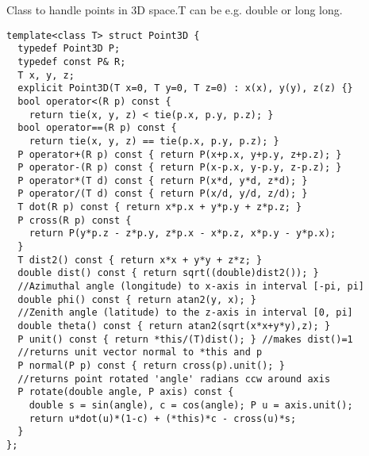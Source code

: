 Class to handle points in 3D space.T can be e.g. double or long long.
\begin{verbatim}
template<class T> struct Point3D {
  typedef Point3D P;
  typedef const P& R;
  T x, y, z;
  explicit Point3D(T x=0, T y=0, T z=0) : x(x), y(y), z(z) {}
  bool operator<(R p) const {
    return tie(x, y, z) < tie(p.x, p.y, p.z); }
  bool operator==(R p) const {
    return tie(x, y, z) == tie(p.x, p.y, p.z); }
  P operator+(R p) const { return P(x+p.x, y+p.y, z+p.z); }
  P operator-(R p) const { return P(x-p.x, y-p.y, z-p.z); }
  P operator*(T d) const { return P(x*d, y*d, z*d); }
  P operator/(T d) const { return P(x/d, y/d, z/d); }
  T dot(R p) const { return x*p.x + y*p.y + z*p.z; }
  P cross(R p) const {
    return P(y*p.z - z*p.y, z*p.x - x*p.z, x*p.y - y*p.x);
  }
  T dist2() const { return x*x + y*y + z*z; }
  double dist() const { return sqrt((double)dist2()); }
  //Azimuthal angle (longitude) to x-axis in interval [-pi, pi]
  double phi() const { return atan2(y, x); } 
  //Zenith angle (latitude) to the z-axis in interval [0, pi]
  double theta() const { return atan2(sqrt(x*x+y*y),z); }
  P unit() const { return *this/(T)dist(); } //makes dist()=1
  //returns unit vector normal to *this and p
  P normal(P p) const { return cross(p).unit(); }
  //returns point rotated 'angle' radians ccw around axis
  P rotate(double angle, P axis) const {
    double s = sin(angle), c = cos(angle); P u = axis.unit();
    return u*dot(u)*(1-c) + (*this)*c - cross(u)*s;
  }
};
\end{verbatim}
